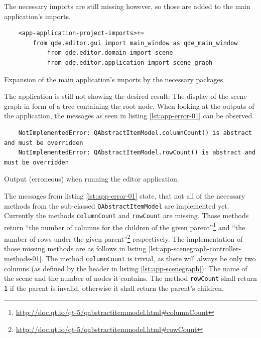 \documentclass[10pt, openright, notitlepage]{scrreprt}
\begin{document}
The necessary imports are still missing however, so those are added to the main
application's imports.

\begin{listing}[H]
\begin{verbatim}
    <app-application-project-imports>+=
        from qde.editor.gui import main_window as qde_main_window
            from qde.editor.domain import scene
            from qde.editor.application import scene_graph
\end{verbatim}
\caption{Expansion of the main application's imports by the necessary packages.}
\end{listing}

The application is still not showing the desired result: The display of the
scene graph in form of a tree containing the root node. When looking at the
outputs of the application, the messages as seen in listing \ref{lst:app-error-01} can
be observed.

\begin{listing}[H]
\begin{verbatim}
    NotImplementedError: QAbstractItemModel.columnCount() is abstract and must be overridden
    NotImplementedError: QAbstractItemModel.rowCount() is abstract and must be overridden
\end{verbatim}
\caption{\label{lst:app-error-01}
Output (erroneous) when running the editor application.}
\end{listing}

The messages from listing \ref{lst:app-error-01} state, that not all of the necessary
methods from the sub-classed \texttt{QAbstractItemModel} are implemented yet.
Currently the methods \texttt{columnCount} and \texttt{rowCount} are
missing. Those methods return ``the number of columns for the children of the
given
parent''\footnote{\url{http://doc.qt.io/qt-5/qabstractitemmodel.html\#columnCount}}
and ``the number of rows under the given
parent''\footnote{\url{http://doc.qt.io/qt-5/qabstractitemmodel.html\#rowCount}}
respectively. The implementation of those missing methods are as follows in
listing \ref{lst:app-scenegraph-controller-methods-01}. The method
\texttt{columnCount} is trivial, as there will always be only two columns (as
defined by the header in listing \ref{lst:app-scenegraph}): The name of the scene and
the number of nodes it contains. The method \texttt{rowCount} shall return
\texttt{1} if the parent is invalid, otherwise it shall return the parent's children.
\end{document}
